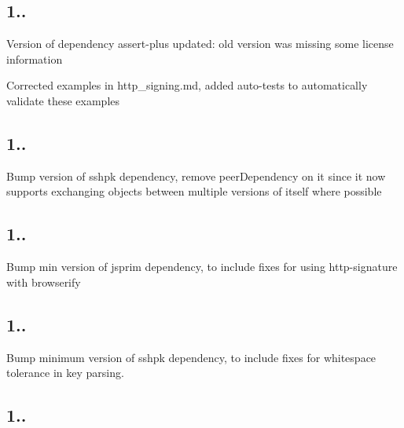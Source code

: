 \subsection*{1..}


\begin{DoxyItemize}
\item Version of dependency {\ttfamily assert-\/plus} updated\+: old version was missing some license information
\item Corrected examples in {\ttfamily http\+\_\+signing.\+md}, added auto-\/tests to automatically validate these examples
\end{DoxyItemize}

\subsection*{1..}


\begin{DoxyItemize}
\item Bump version of {\ttfamily sshpk} dependency, remove peer\+Dependency on it since it now supports exchanging objects between multiple versions of itself where possible
\end{DoxyItemize}

\subsection*{1..}


\begin{DoxyItemize}
\item Bump min version of {\ttfamily jsprim} dependency, to include fixes for using http-\/signature with {\ttfamily browserify}
\end{DoxyItemize}

\subsection*{1..}


\begin{DoxyItemize}
\item Bump minimum version of {\ttfamily sshpk} dependency, to include fixes for whitespace tolerance in key parsing.
\end{DoxyItemize}

\subsection*{1..}



